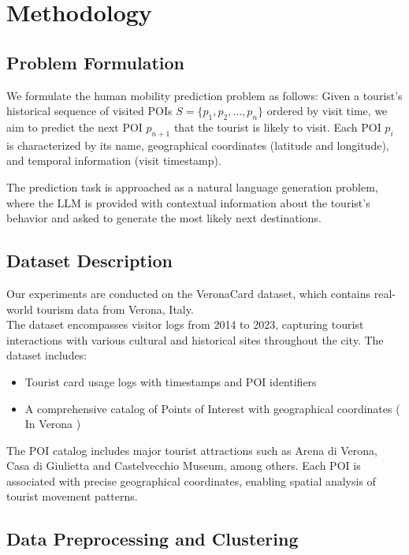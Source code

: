 \documentclass[12pt,a4paper]{article}
\begin{document}
\section{Methodology}

\subsection{Problem Formulation}

We formulate the human mobility prediction problem as follows: Given a tourist's historical sequence of visited POIs $S = \{p_1, p_2, ..., p_n\}$ ordered by visit time, we aim to predict the next POI $p_{n+1}$ that the tourist is likely to visit. Each POI $p_i$ is characterized by its name, geographical coordinates (latitude and longitude), and temporal information (visit timestamp).

The prediction task is approached as a natural language generation problem, where the LLM is provided with contextual information about the tourist's behavior and asked to generate the most likely next destinations.

\subsection{Dataset Description}

Our experiments are conducted on the VeronaCard dataset, which contains real-world tourism data from Verona, Italy.\\ The dataset encompasses visitor logs from 2014 to 2023, capturing tourist interactions with various cultural and historical sites throughout the city. The dataset includes:

\begin{itemize}
\item Tourist card usage logs with timestamps and POI identifiers
\item A comprehensive catalog of Points of Interest with geographical coordinates ( In Verona )
\end{itemize}

The POI catalog includes major tourist attractions such as Arena di Verona, Casa di Giulietta and Castelvecchio Museum, among others. Each POI is associated with precise geographical coordinates, enabling spatial analysis of tourist movement patterns.

\subsection{Data Preprocessing and Clustering}
\end{document}
